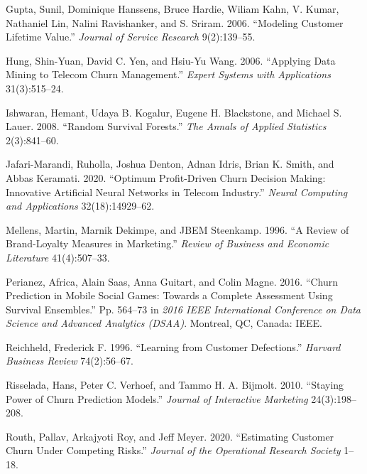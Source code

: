 \documentclass[
  12pt,
]{article}
\newlength{\cslhangindent}
\newlength{\cslentryspacingunit} %
\newenvironment{CSLReferences}[2] %
 {%
  \setlength{\parindent}{0pt}
  \ifodd #1
  \let\oldpar\par
  \def\par{\hangindent=\cslhangindent\oldpar}
  \fi
  \setlength{\parskip}{#2\cslentryspacingunit}
 }%
 {}
\begin{document}
\begin{CSLReferences}{1}{0}
\leavevmode{}%
Gupta, Sunil, Dominique Hanssens, Bruce Hardie, Wiliam Kahn, V. Kumar, Nathaniel Lin, Nalini Ravishanker, and S. Sriram. 2006. {``Modeling Customer Lifetime Value.''} \emph{Journal of Service Research} 9(2):139--55.

\leavevmode{}%
Hung, Shin-Yuan, David C. Yen, and Hsiu-Yu Wang. 2006. {``Applying Data Mining to Telecom Churn Management.''} \emph{Expert Systems with Applications} 31(3):515--24.

\leavevmode{}%
Ishwaran, Hemant, Udaya B. Kogalur, Eugene H. Blackstone, and Michael S. Lauer. 2008. {``Random Survival Forests.''} \emph{The Annals of Applied Statistics} 2(3):841--60.

\leavevmode{}%
Jafari-Marandi, Ruholla, Joshua Denton, Adnan Idris, Brian K. Smith, and Abbas Keramati. 2020. {``Optimum Profit-Driven Churn Decision Making: Innovative Artificial Neural Networks in Telecom Industry.''} \emph{Neural Computing and Applications} 32(18):14929--62.

\leavevmode{}%
Mellens, Martin, Marnik Dekimpe, and JBEM Steenkamp. 1996. {``A Review of Brand-Loyalty Measures in Marketing.''} \emph{Review of Business and Economic Literature} 41(4):507--33.

\leavevmode{}%
Perianez, Africa, Alain Saas, Anna Guitart, and Colin Magne. 2016. {``Churn {Prediction} in {Mobile} {Social} {Games}: {Towards} a {Complete} {Assessment} {Using} {Survival} {Ensembles}.''} Pp. 564--73 in \emph{2016 {IEEE} {International} {Conference} on {Data} {Science} and {Advanced} {Analytics} ({DSAA})}. Montreal, QC, Canada: IEEE.

\leavevmode{}%
Reichheld, Frederick F. 1996. {``Learning from Customer Defections.''} \emph{Harvard Business Review} 74(2):56--67.

\leavevmode{}%
Risselada, Hans, Peter C. Verhoef, and Tammo H. A. Bijmolt. 2010. {``Staying {Power} of {Churn} {Prediction} {Models}.''} \emph{Journal of Interactive Marketing} 24(3):198--208.

\leavevmode{}%
Routh, Pallav, Arkajyoti Roy, and Jeff Meyer. 2020. {``Estimating Customer Churn Under Competing Risks.''} \emph{Journal of the Operational Research Society} 1--18.


\end{CSLReferences}
\end{document}
